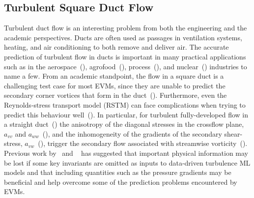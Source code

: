 \documentclass[11pt]{article}
\numberwithin{equation}{section}
\theoremstyle{plain}
\theoremstyle{definition}
\begin{document}
\subsection{Turbulent Square Duct Flow}
\label{subsec:Turbulent Duct flow}
Turbulent duct flow is an interesting problem from both the engineering and the academic perspectives. Ducts are often used as passages in ventilation systems, heating, and air conditioning to both remove and deliver air. The accurate prediction of turbulent flow in ducts is important in many practical applications such as in the aerospace~(\cite{duct_aerospace}), agrofood~(\cite{agrofood}), process~(\cite{process}), and nuclear~(\cite{nuclear}) industries to name a few. From an academic standpoint, the flow in a square duct is a challenging test case for most EVMs, since they are unable to predict the secondary corner vortices that form in the duct~(\cite{secondary}). Furthermore, even the Reynolds-stress transport model (RSTM) can face complications when trying to predict this behaviour well~(\cite{Gerolymos_2015,gerorms,sormc,3dre}). In particular, for turbulent fully-developed flow in a straight duct~(\cite{gessner_jones_1965}) the anisotropy of the diagonal stresses in the crossflow plane, $a_{vv}$ and $a_{ww}$~(\cite{peter}), and the inhomogeneity of the gradients of the secondary shear-stress, $a_{vw}$~(\cite{brundrett_baines_1964}), trigger the secondary flow associated with streamwise vorticity~(\cite{Gerolymos_2015}). Previous work by~\cite{wu_again} and ~\cite{laizet} has suggested that important physical information may be lost if some key invariants are omitted as inputs to data-driven turbulence ML models and that including quantities such as the pressure gradients may be beneficial and help overcome some of the prediction problems encountered by EVMs. 
\end{document}
